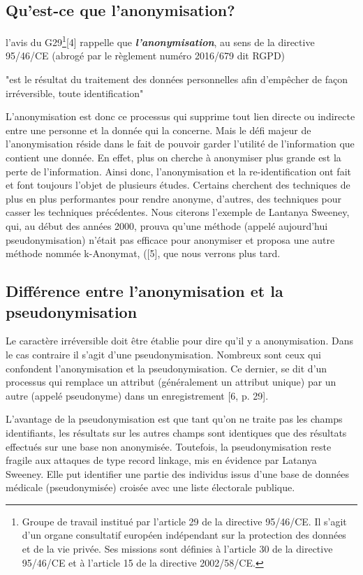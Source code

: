 \subsection{Qu'est-ce que l’anonymisation?} 

l’avis du G29\footnote{Groupe de travail institué par l’article 29 de la directive 95/46/CE. Il s’agit d’un organe consultatif européen indépendant
sur la protection des données et de la vie privée. Ses missions sont définies à l’article 30 de la directive 95/46/CE et à l’article
15 de la directive 2002/58/CE.}[4] rappelle que \textbf{\emph{l’anonymisation}}, au sens de la directive 95/46/CE (abrogé par le règlement numéro 2016/679 dit \gls{RGPD})
\begin{em}
    "est le résultat du traitement des données personnelles afin d’empêcher de façon irréversible, toute identification"
\end{em}  

L’anonymisation est donc ce processus qui supprime tout lien directe ou indirecte entre une personne et la donnée qui la concerne. Mais le défi majeur de l’anonymisation réside dans le fait de pouvoir garder l’utilité de l’information que contient une donnée.  En effet, plus on cherche à anonymiser plus grande est la perte de l’information.  
Ainsi donc, l’anonymisation et la re-identification ont fait et font toujours l’objet de plusieurs études. Certains cherchent des techniques de plus en plus performantes pour rendre anonyme, d’autres, des techniques pour casser les techniques précédentes. Nous citerons l'exemple de Lantanya Sweeney, qui, au début des années 2000, prouva qu’une méthode (appelé aujourd’hui pseudonymisation) n’était pas efficace pour anonymiser et   proposa une autre méthode nommée k-Anonymat, ([5], que nous verrons plus tard. 

\subsection{Différence entre l’anonymisation et la pseudonymisation}

Le caractère irréversible doit être établie pour dire qu’il y a anonymisation. Dans le cas contraire il s’agit d’une pseudonymisation. Nombreux sont ceux qui confondent l’anonymisation et la pseudonymisation. Ce dernier, se dit d’un processus qui remplace un attribut (généralement un attribut unique) par un autre (appelé pseudonyme) dans un enregistrement [6, p. 29]. 

L’avantage de la pseudonymisation est que tant qu’on ne traite pas les champs identifiants, les résultats sur les autres champs sont identiques que des résultats effectués sur une base non anonymisée. Toutefois, la pseudonymisation reste fragile aux attaques de type record linkage, mis en évidence par Latanya Sweeney. Elle put identifier une partie des individus issus d’une base de données médicale (pseudonymisée) croisée avec une liste électorale publique. 

